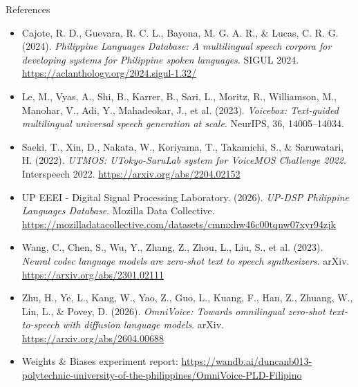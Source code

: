 \documentclass[aspectratio=169]{beamer}
\begin{document}
\begin{frame}{References}
  \tiny
  \begin{itemize}
    \item Cajote, R. D., Guevara, R. C. L., Bayona, M. G. A. R., \& Lucas, C. R. G. (2024). \textit{Philippine Languages Database: A multilingual speech corpora for developing systems for Philippine spoken languages}. SIGUL 2024. \url{https://aclanthology.org/2024.sigul-1.32/}
    \item Le, M., Vyas, A., Shi, B., Karrer, B., Sari, L., Moritz, R., Williamson, M., Manohar, V., Adi, Y., Mahadeokar, J., et al. (2023). \textit{Voicebox: Text-guided multilingual universal speech generation at scale}. NeurIPS, 36, 14005--14034.
    \item Saeki, T., Xin, D., Nakata, W., Koriyama, T., Takamichi, S., \& Saruwatari, H. (2022). \textit{UTMOS: UTokyo-SaruLab system for VoiceMOS Challenge 2022}. Interspeech 2022. \url{https://arxiv.org/abs/2204.02152}
    \item UP EEEI - Digital Signal Processing Laboratory. (2026). \textit{UP-DSP Philippine Languages Database}. Mozilla Data Collective. \url{https://mozilladatacollective.com/datasets/cmmxhw46c00tqnw07xyr94zjk}
    \item Wang, C., Chen, S., Wu, Y., Zhang, Z., Zhou, L., Liu, S., et al. (2023). \textit{Neural codec language models are zero-shot text to speech synthesizers}. arXiv. \url{https://arxiv.org/abs/2301.02111}
    \item Zhu, H., Ye, L., Kang, W., Yao, Z., Guo, L., Kuang, F., Han, Z., Zhuang, W., Lin, L., \& Povey, D. (2026). \textit{OmniVoice: Towards omnilingual zero-shot text-to-speech with diffusion language models}. arXiv. \url{https://arxiv.org/abs/2604.00688}
    \item Weights \& Biases experiment report: \url{https://wandb.ai/duncanb013-polytechnic-university-of-the-philippines/OmniVoice-PLD-Filipino}
  \end{itemize}
\end{frame}
\end{document}
